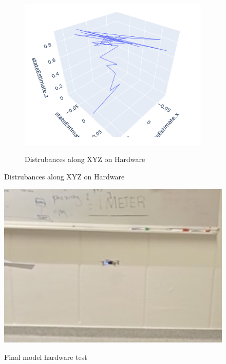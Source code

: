 \documentclass[../templateLTHtwocol.tex]{subfiles}
\begin{document}
\begin{figure}[H]
\begin{subfigure}[b]{0.25\textwidth}
		\label{final_xyz:fig}
	\end{subfigure}
	\hfill
	\begin{subfigure}[b]{0.25\textwidth}
		\caption{Distrubances along XYZ on Hardware}
		\includegraphics[width=\textwidth]{resources/final_model/3d-trajectory.png}
		\label{final_hardware:fig}
	\end{subfigure}
\end{figure}

\begin{figure}[H]
	\centering
	\caption{Final model hardware test}
	\includegraphics[scale=0.3]{resources/final_model/disturbances_hardware.png}
	\label{hardware:fig}
\end{figure}
\end{document}
